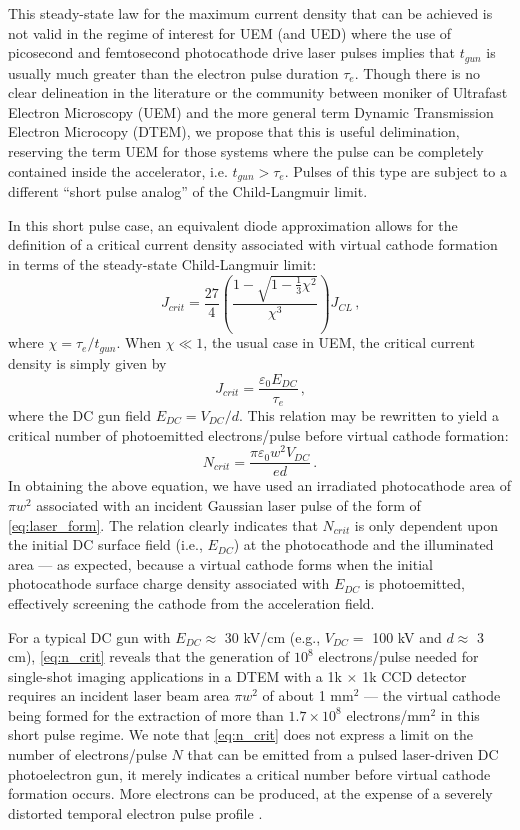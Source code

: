 This steady-state law for the maximum current density that can be achieved is not valid in the regime of interest for UEM (and UED) where the use of picosecond and femtosecond photocathode drive laser pulses implies that $t_{gun}$ is usually much greater than the electron pulse duration $\tau_e$.
Though there is no clear delineation in the literature or the community between moniker of Ultrafast Electron Microscopy (UEM) and the more general term Dynamic Transmission Electron Microcopy (DTEM), we propose that this is useful delimination, reserving the term UEM for those systems where the pulse can be completely contained inside the accelerator, i.e. $t_{gun} > \tau_e$.
Pulses of this type are subject to a different ``short pulse analog'' of the Child-Langmuir limit.

In this short pulse case, an equivalent diode approximation \cite{valfells_effects_2002} allows for the definition of a critical current density associated with virtual cathode formation in terms of the steady-state Child-Langmuir limit:
\begin{equation}
  J_{crit} = \frac{27}{4} \left ( \frac{ 1 - \sqrt{1-\tfrac{1}{3} \chi^2} }{ \chi^3 } \right ) J_{CL} \,\text{,}
\end{equation}
where $\chi = \tau_e / t_{gun}$.
When $\chi \ll 1$, the usual case in UEM, the critical current density is simply given by
\begin{equation}
  J_{crit} = \frac{\varepsilon_0 E_{DC}}{\tau_e} \,\text{,}
\end{equation}
where the DC gun field $E_{DC} = V_{DC}/d$.
This relation may be rewritten to yield a critical number of photoemitted electrons/pulse before virtual cathode formation:
\begin{equation} \label{eq:n_crit}
  N_{crit} = \frac{\pi \varepsilon_0 w^2 V_{DC}}{e d} \,\text{.}
\end{equation}
In obtaining the above equation, we have used an irradiated photocathode area of $\pi w^2$ associated with an incident Gaussian laser pulse of the form of \ref{eq:laser_form}.
The relation clearly indicates that $N_{crit}$ is only dependent upon the initial DC surface field (i.e., $E_{DC}$) at the photocathode and the illuminated area --- as expected, because a virtual cathode forms when the initial photocathode surface charge density associated with $E_{DC}$ is photoemitted, effectively screening the cathode from the acceleration field.

For a typical DC gun with $E_{DC} \approx $ 30 kV/cm (e.g., $V_{DC} = $ 100 kV and $d \approx $ 3 cm), \ref{eq:n_crit} reveals that the generation of $10^8$ electrons/pulse needed for single-shot imaging applications in a DTEM with a 1k $\times$ 1k CCD detector requires an incident laser beam area $\pi w^2$ of about 1 mm$^2$ --- the virtual cathode being formed for the extraction of more than $1.7 \times 10^8$ electrons/mm$^2$ in this short pulse regime.
We note that \ref{eq:n_crit} does not express a limit on the number of electrons/pulse $N$ that can be emitted from a pulsed laser-driven DC photoelectron gun, it merely indicates a critical number before virtual cathode formation occurs.
More electrons can be produced, at the expense of a severely distorted temporal electron pulse profile \cite{valfells_effects_2002}.

